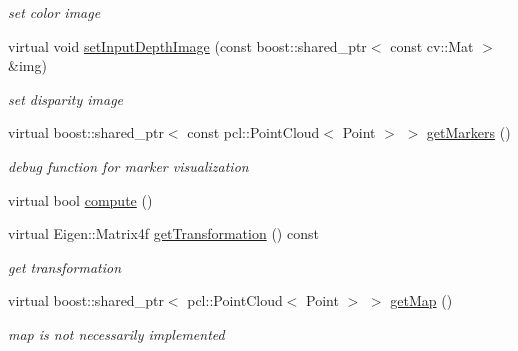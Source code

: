 \begin{DoxyCompactItemize}
\begin{DoxyCompactList}\small\item\em set color image \item\end{DoxyCompactList}\item 
\hypertarget{classGeneralRegistration_a9302c8dbf62533851ef2f9ca888dcc7a}{
virtual void \hyperlink{classGeneralRegistration_a9302c8dbf62533851ef2f9ca888dcc7a}{setInputDepthImage} (const boost::shared\_\-ptr$<$ const cv::Mat $>$ \&img)}
\label{classGeneralRegistration_a9302c8dbf62533851ef2f9ca888dcc7a}

\begin{DoxyCompactList}\small\item\em set disparity image \item\end{DoxyCompactList}\item 
\hypertarget{classGeneralRegistration_aeeaa5ccc625af76c73fd95165447ca61}{
virtual boost::shared\_\-ptr$<$ const pcl::PointCloud$<$ Point $>$ $>$ \hyperlink{classGeneralRegistration_aeeaa5ccc625af76c73fd95165447ca61}{getMarkers} ()}
\label{classGeneralRegistration_aeeaa5ccc625af76c73fd95165447ca61}

\begin{DoxyCompactList}\small\item\em debug function for marker visualization \item\end{DoxyCompactList}\item 
virtual bool \hyperlink{classGeneralRegistration_a1576d568bd1bc5de026be9441eeabd48}{compute} ()
\item 
\hypertarget{classGeneralRegistration_acb98af3d4fce5549db0c3fd7fb880c07}{
virtual Eigen::Matrix4f \hyperlink{classGeneralRegistration_acb98af3d4fce5549db0c3fd7fb880c07}{getTransformation} () const }
\label{classGeneralRegistration_acb98af3d4fce5549db0c3fd7fb880c07}

\begin{DoxyCompactList}\small\item\em get transformation \item\end{DoxyCompactList}\item 
\hypertarget{classGeneralRegistration_aa3ecd55d2f293a224049ca47be3a07c8}{
virtual boost::shared\_\-ptr$<$ pcl::PointCloud$<$ Point $>$ $>$ \hyperlink{classGeneralRegistration_aa3ecd55d2f293a224049ca47be3a07c8}{getMap} ()}
\label{classGeneralRegistration_aa3ecd55d2f293a224049ca47be3a07c8}

\begin{DoxyCompactList}\small\item\em map is not necessarily implemented \item\end{DoxyCompactList}\end{DoxyCompactItemize}
